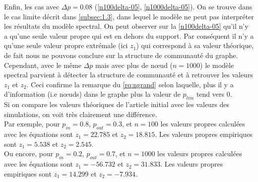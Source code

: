 Enfin, les cas avec $\Delta p = 0.08$ (\autoref{n100delta-05}, \autoref{n1000delta-05}). 
On se trouve dans le cas limite décrit dans \autoref{subsec:1.3}, dans lequel le modèle ne peut pas interpréter les résultats du modèle spectral.
On peut observer sur la \autoref{n100delta-05} qu'il n'y a qu'une seule valeur propre qui est en dehors du support.
Par conséquent il n'y a qu'une seule valeur propre extrémale (ici $z_1$) qui correspond à sa valeur théorique, de fait nous ne pouvons conclure sur la structure de communauté du graphe.
Cependant, avec le même $\Delta p$ mais avec plus de nœud ($n = 1000$) le modèle spectral parvient à détecter la structure de communauté et à retrouver les valeurs $z_1$ et $z_2$.  
Ceci confirme la remarque du \autoref{rq:ngrand} selon laquelle, plus il y a d’information (i.e nœuds) dans le graphe plus la valeur de $p_{lim}$ tend vers $0$.\\

Si on compare les valeurs théoriques de l'article initial \cite{raj_rao} avec les valeurs des simulations, on voit très clairement une différence.\\
Par exemple, pour $p_{in} = 0.8$, $p_{out}=0.3$, et $n=100$ les valeurs propres calculées avec les équations  sont $z_1 = 22.785$ et $z_2 = 18.815$.
Les valeurs propres empiriques sont $z_1 = 5.538$ et $z_2 = 2.545$.\\
Ou encore, pour $p_{in} = 0.2$, $p_{out}=0.7$, et $n=1000$ les valeurs propres calculées avec les équations  sont $z_1 = -56.732$ et $z_2 = 31.833$.
Les valeurs propres empiriques sont $z_1 = 14.299$ et $z_2 = -7.934$.